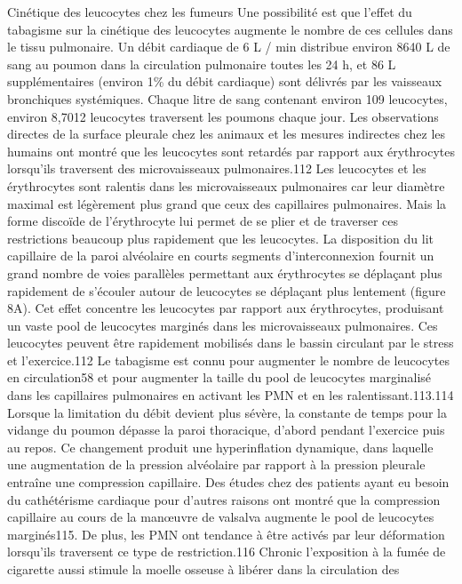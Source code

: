 \documentclass[12pt,]{article}
\begin{document}
Cinétique des leucocytes chez les fumeurs Une possibilité est que
l'effet du tabagisme sur la cinétique des leucocytes augmente le nombre
de ces cellules dans le tissu pulmonaire. Un débit cardiaque de 6 L /
min distribue environ 8640 L de sang au poumon dans la circulation
pulmonaire toutes les 24 h, et 86 L supplémentaires (environ 1\% du
débit cardiaque) sont délivrés par les vaisseaux bronchiques
systémiques. Chaque litre de sang contenant environ 109 leucocytes,
environ 8,7012 leucocytes traversent les poumons chaque jour. Les
observations directes de la surface pleurale chez les animaux et les
mesures indirectes chez les humains ont montré que les leucocytes sont
retardés par rapport aux érythrocytes lorsqu'ils traversent des
microvaisseaux pulmonaires.112 Les leucocytes et les érythrocytes sont
ralentis dans les microvaisseaux pulmonaires car leur diamètre maximal
est légèrement plus grand que ceux des capillaires pulmonaires. Mais la
forme discoïde de l'érythrocyte lui permet de se plier et de traverser
ces restrictions beaucoup plus rapidement que les leucocytes. La
disposition du lit capillaire de la paroi alvéolaire en courts segments
d'interconnexion fournit un grand nombre de voies parallèles permettant
aux érythrocytes se déplaçant plus rapidement de s'écouler autour de
leucocytes se déplaçant plus lentement (figure 8A). Cet effet concentre
les leucocytes par rapport aux érythrocytes, produisant un vaste pool de
leucocytes marginés dans les microvaisseaux pulmonaires. Ces leucocytes
peuvent être rapidement mobilisés dans le bassin circulant par le stress
et l'exercice.112 Le tabagisme est connu pour augmenter le nombre de
leucocytes en circulation58 et pour augmenter la taille du pool de
leucocytes marginalisé dans les capillaires pulmonaires en activant les
PMN et en les ralentissant.113.114 Lorsque la limitation du débit
devient plus sévère, la constante de temps pour la vidange du poumon
dépasse la paroi thoracique, d'abord pendant l'exercice puis au repos.
Ce changement produit une hyperinflation dynamique, dans laquelle une
augmentation de la pression alvéolaire par rapport à la pression
pleurale entraîne une compression capillaire. Des études chez des
patients ayant eu besoin du cathétérisme cardiaque pour d'autres raisons
ont montré que la compression capillaire au cours de la manœuvre de
valsalva augmente le pool de leucocytes marginés115. De plus, les PMN
ont tendance à être activés par leur déformation lorsqu'ils traversent
ce type de restriction.116 Chronic l'exposition à la fumée de cigarette
aussi stimule la moelle osseuse à libérer dans la circulation des
\end{document}
